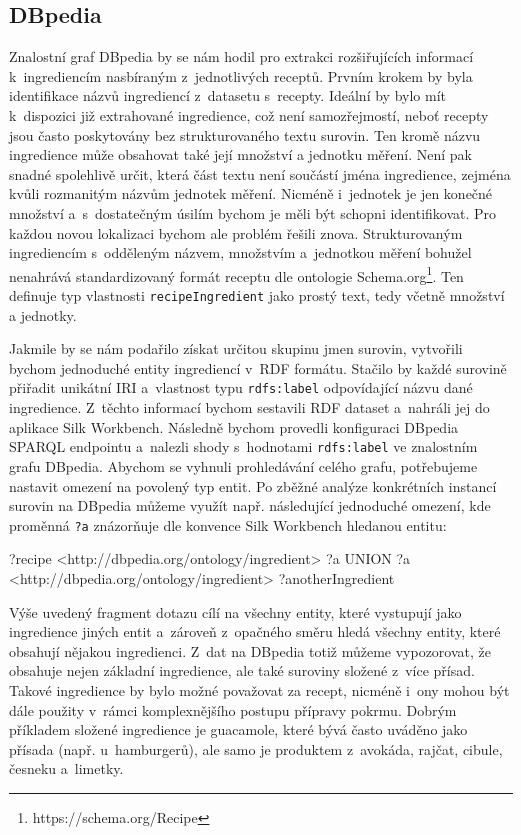 \subsection{DBpedia}

Znalostní graf DBpedia by se nám hodil pro extrakci rozšiřujících informací k~ingrediencím nasbíraným z~jednotlivých receptů. Prvním krokem by byla identifikace názvů ingrediencí z~datasetu s~recepty. Ideální by bylo mít k~dispozici již extrahované ingredience, což není samozřejmostí, neboť recepty jsou často poskytovány bez strukturovaného textu surovin. Ten kromě názvu ingredience může obsahovat také její množství a jednotku měření. Není pak snadné spolehlivě určit, která část textu není součástí jména ingredience, zejména kvůli rozmanitým názvům jednotek měření. Nicméně i~jednotek je jen konečné množství a~s~dostatečným úsilím bychom je měli být schopni identifikovat. Pro každou novou lokalizaci bychom ale problém řešili znova. Strukturovaným ingrediencím s~odděleným názvem, množstvím a~jednotkou měření bohužel nenahrává standardizovaný formát receptu dle ontologie Schema.org\footnote{https://schema.org/Recipe}. Ten definuje typ vlastnosti \texttt{recipeIngredient} jako prostý text, tedy včetně množství a jednotky.

Jakmile by se nám podařilo získat určitou skupinu jmen surovin, vytvořili bychom jednoduché entity ingrediencí v~RDF formátu. Stačilo by každé surovině přiřadit unikátní IRI a~vlastnost typu \texttt{rdfs:label} odpovídající názvu dané ingredience. Z~těchto informací bychom sestavili RDF dataset a~nahráli jej do aplikace Silk Workbench. Následně bychom provedli konfiguraci DBpedia SPARQL endpointu a~nalezli shody s~hodnotami \texttt{rdfs:label} ve znalostním grafu DBpedia. Abychom se vyhnuli prohledávání celého grafu, potřebujeme nastavit omezení na povolený typ entit. Po zběžné analýze konkrétních instancí surovin na DBpedia můžeme využít např. následující jednoduché omezení, kde proměnná \texttt{?a} znázorňuje dle konvence Silk Workbench hledanou entitu:

\begin{code}
{ 
    {
        ?recipe <http://dbpedia.org/ontology/ingredient> ?a
    } UNION {
        ?a <http://dbpedia.org/ontology/ingredient> ?anotherIngredient
    } 
}
\end{code}

Výše uvedený fragment dotazu cílí na všechny entity, které vystupují jako ingredience jiných entit a~zároveň z~opačného směru hledá všechny entity, které obsahují nějakou ingredienci. Z~dat na DBpedia totiž můžeme vypozorovat, že obsahuje nejen základní ingredience, ale také suroviny složené z~více přísad. Takové ingredience by bylo možné považovat za recept, nicméně i~ony mohou být dále použity v~rámci komplexnějšího postupu přípravy pokrmu. Dobrým příkladem složené ingredience je guacamole, které bývá často uváděno jako přísada (např. u~hamburgerů), ale samo je produktem z~avokáda, rajčat, cibule, česneku a~limetky.

